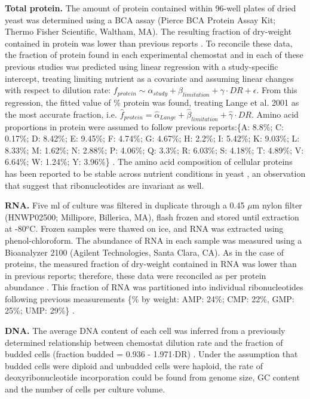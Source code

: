 \textbf{Total protein.} The amount of protein contained within 96-well plates of dried yeast was determined using a BCA assay (Pierce BCA Protein Assay Kit; Thermo Fisher Scientific, Waltham, MA). The resulting fraction of dry-weight contained in protein was lower than previous reports \cite{main-Schulze:1995uv, main-Lange:2001th}.  To reconcile these data, the fraction of protein found in each experimental chemostat and in each of these previous studies was predicted using linear regression with a study-specific intercept, treating limiting nutrient as a covariate and assuming linear changes with respect to dilution rate: $f_{protein} \sim \alpha_{study} + \beta_{limitation} + \gamma \cdot DR + \epsilon$.  From this regression, the fitted value of \% protein was found, treating Lange et al. 2001 as the most accurate fraction, i.e. $\hat{f}_{protein} = \hat{\alpha}_{Lange} + \hat{\beta}_{limitation} + \hat{\gamma} \cdot DR$.  Amino acid proportions in protein were assumed to follow previous reports:\{A: 8.8\%; C: 0.17\%; D: 8.42\%; E: 9.45\%; F: 4.74\%; G: 4.67\%; H: 2.2\%; I: 5.42\%; K: 9.03\%; L: 8.33\%; M: 1.62\%; N: 2.88\%; P: 4.06\%; Q: 3.3\%; R: 6.03\%; S: 4.18\%; T: 4.89\%; V: 6.64\%; W: 1.24\%; Y: 3.96\%\} \cite{Herrgard:2008gb}.  The amino acid composition of cellular proteins has been reported to be stable across nutrient conditions in yeast \cite{Lange:2001th}, an observation that suggest that ribonucleotides are invariant as well.

\textbf{RNA.} Five ml of culture was filtered in duplicate through a 0.45 $\mu$m nylon filter (HNWP02500; Millipore, Billerica, MA), flash frozen and stored until extraction at -80$^{o}$C.  Frozen samples were thawed on ice, and RNA was extracted using phenol-chloroform.  The abundance of RNA in each sample was measured using a Bioanalyzer 2100 (Agilent Technologies, Santa Clara, CA).  As in the case of proteins, the measured fraction of dry-weight contained in RNA was lower than in previous reports; therefore, these data were reconciled as per protein abundance \cite{Schulze:1995uv, Lange:2001th}. This fraction of RNA was partitioned into individual ribonucleotides following previous measurements \{\% by weight: AMP: 24\%; CMP: 22\%, GMP: 25\%; UMP: 29\%\} \cite{Herrgard:2008gb}.

\textbf{DNA.} The average DNA content of each cell was inferred from a previously determined relationship between chemostat dilution rate and the fraction of budded cells (fraction budded = 0.936 - 1.971$\cdot$DR) \cite{main-Brauer:2008jn}.  Under the assumption that budded cells were diploid and unbudded cells were haploid, the rate of deoxyribonucleotide incorporation could be found from genome size, GC content and the number of cells per culture volume.


